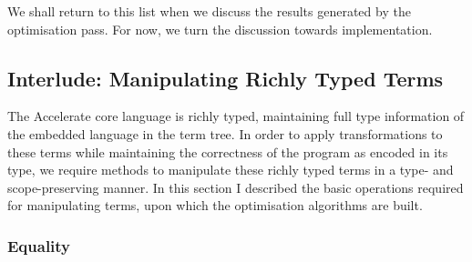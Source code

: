 We shall return to this list when we discuss the results generated by the
optimisation pass. For now, we turn the discussion towards implementation.



% 
% 
% 
% 

\subsection{Interlude: Manipulating Richly Typed Terms}

The Accelerate core language is richly typed, maintaining full type information
of the embedded language in the term tree. In order to apply transformations to
these terms while maintaining the correctness of the program as encoded in its
type, we require methods to manipulate these richly typed terms in a type- and
scope-preserving manner. In this section I described the basic operations
required for manipulating terms, upon which the optimisation algorithms are
built.


\subsubsection{Equality}

